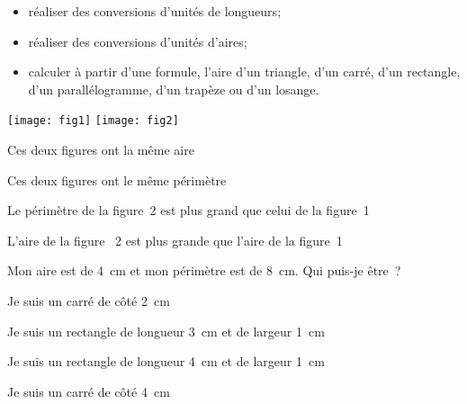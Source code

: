 \begin{acquis}
\begin{itemize}
\item réaliser des conversions d'unités de longueurs;
\item réaliser des conversions d'unités d'aires;
\item calculer à partir d'une formule, l'aire d'un triangle, d'un carré, d'un rectangle, d'un parallélogramme, d'un trapèze ou d'un losange.
\end{itemize}
\end{acquis}


\begin{QCM}
  \begin{GroupeQCM}
    \begin{exercice}
    
\begin{center}      \texttt{[image: fig1]} \texttt{[image: fig2]}  \end{center}
      \begin{ChoixQCM}{4}
      \item Ces deux figures ont la même aire
      \item Ces deux figures ont le même périmètre
      \item Le périmètre de la figure 2 est plus grand que celui de la figure 1
      \item L'aire de la figure  2 est plus grande que l'aire de la figure 1
      \end{ChoixQCM}
\begin{corrige}
   \end{corrige}
    \end{exercice}


    \begin{exercice}
      Mon aire est de 4 cm et mon périmètre est de 8 cm. Qui puis‑je être ?
      \begin{ChoixQCM}{4}
      \item Je suis un carré de côté 2 cm
      \item Je suis un rectangle de longueur 3 cm et de largeur 1 cm
      \item Je suis un rectangle de longueur 4 cm et de largeur 1 cm
      \item Je suis un carré de côté 4 cm
      \end{ChoixQCM}
\begin{corrige}
   \end{corrige}
    \end{exercice}
    

\end{GroupeQCM}
\end{QCM}
